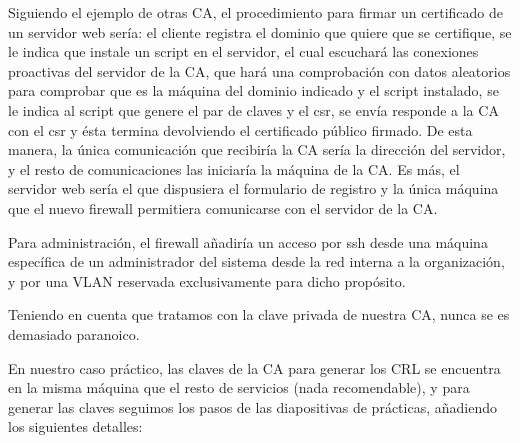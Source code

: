\documentclass[]{article}
\begin{document}
Siguiendo el ejemplo de otras CA, el procedimiento para firmar un certificado de un servidor web sería: el cliente registra el dominio que quiere que se certifique, se le indica que instale un script en el servidor, el cual escuchará las conexiones proactivas del servidor de la CA, que hará una comprobación con datos aleatorios para comprobar que es la máquina del dominio indicado y el script instalado, se le indica al script que genere el par de claves y el csr, se envía responde a la CA con el csr y ésta termina devolviendo el certificado público firmado. De esta manera, la única comunicación que recibiría la CA sería la dirección del servidor, y el resto de comunicaciones las iniciaría la máquina de la CA. Es más, el servidor web sería el que dispusiera el formulario de registro y la única máquina que el nuevo firewall permitiera comunicarse con el servidor de la CA.

Para administración, el firewall añadiría un acceso por ssh desde una máquina específica de un administrador del sistema desde la red interna a la organización, y por una VLAN reservada exclusivamente para dicho propósito.

Teniendo en cuenta que tratamos con la clave privada de nuestra CA, nunca se es demasiado paranoico.


\hfill


En nuestro caso práctico, las claves de la CA para generar los CRL se encuentra en la misma máquina que el resto de servicios (nada recomendable), y para generar las claves seguimos los pasos de las diapositivas de prácticas, añadiendo los siguientes detalles:
\end{document}
